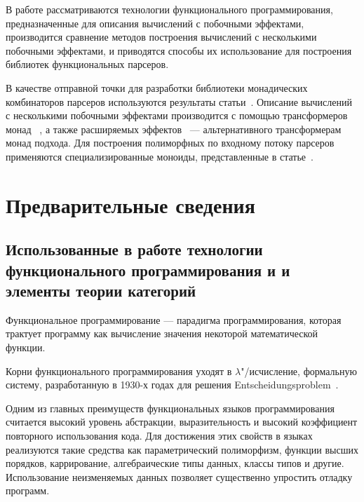 





\Intro
В работе рассматриваются технологии функционального программирования, 
предназначенные для описания вычислений с побочными эффектами, производится 
сравнение методов построения вычислений с несколькими побочными эффектами,
и приводятся способы их использование для построения библиотек функциональных 
парсеров.

В качестве отправной точки для разработки библиотеки монадических комбинаторов
парсеров используются результаты статьи~\cite{monParsing}. Описание вычислений
с несколькими побочными эффектами производится с помощью трансформеров монад
~\cite{monadTransformers}, а также расширяемых эффектов~\cite{extEffects} --- 
альтернативного трансформерам монад подхода. Для построения полиморфных по 
входному потоку парсеров применяются специализированные моноиды, представленные 
в статье~\cite{monoids}.

\chapter{Предварительные сведения}

\section{Использованные в работе технологии функционального программирования и
и элементы теории категорий}

Функциональное программирование --- парадигма программирования, которая трактует 
программу как вычисление значения некоторой математической функции.

Корни функционального программирования уходят в $\lambda$"/исчисление, 
формальную систему, разработанную в 1930-х годах для решения 
Entscheidungsproblem~\cite{entscheidungsproblem}.

Одним из главных преимуществ функциональных языков программирования считается 
высокий уровень абстракции, выразительность и высокий коэффициент повторного 
использования кода. Для достижения этих свойств в языках реализуются такие 
средства как параметрический полиморфизм, функции высших порядков, каррирование, 
алгебраические типы данных, классы типов и другие. Использование неизменяемых 
данных позволяет существенно упростить отладку программ.

